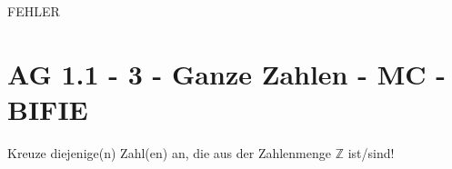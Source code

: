 FEHLER
\section{AG 1.1 - 3 - Ganze Zahlen - MC - BIFIE}

\begin{beispiel}[AG 1.1]{1} %
Kreuze diejenige(n) Zahl(en) an, die aus der Zahlenmenge $\mathbb{Z}$ ist/sind!
\end{beispiel}
